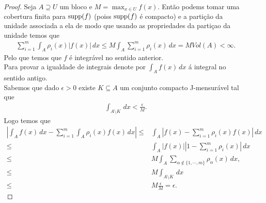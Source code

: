 \begin{proof} 
  Seja $A\supseteq U$ um bloco e $M=\max_{x\in U}f(x)$. Então podems tomar uma cobertura finita para $\operatorname{supp}(f)$ (poiss $\operatorname{supp}(f)$ é compacto) e a partição da unidade associada a ela de modo que usando as propriedades da partiçao da unidade temos que
  \begin{align*}
    \sum_{i=1}^{m}\int_{A}\rho_{i}(x)|f(x)|\,dx\leq M \int_{A}\sum_{i=1}^{m}\rho_i(x)\,dx=MVol(A)<\infty.
  \end{align*}
  Pelo que temos que $f$ é integrável no sentido anterior.\\
  Para provar a igualdade de integrais denote por $\int_{A}f(x)\,dx$ á integral no sentido antigo.\\
  Sabemos que dado $\epsilon>0$ existe $K\subseteq A$ um conjunto compacto J-mensurável tal que
  \begin{align*}
    \int_{A\setminus K}\,dx<\frac{\epsilon}{M}.
  \end{align*}
  Logo temos que
  \begin{align*}
    \left| \int_{A}f(x)\,dx-\sum_{i=1}^{m}\int_{A}\rho_{i}(x)f(x)\,dx \right|\leq& \int_{A}\left| f(x)-\sum_{i=1}^{m}\rho_{i}(x)f(x) \right|\,dx\\
    \leq& \int_{A}|f(x)|\left| 1-\sum_{i=1}^{m}\rho_i(x) \right|\,dx\\
    \leq& M \int_{A}\sum_{\alpha\notin\{1,\cdots,m\}}\rho_{\alpha}(x)\,dx,\\
    \leq& M \int_{A\setminus K}\,dx\\
    \leq& M\frac{\epsilon}{M}=\epsilon.
  \end{align*}
\end{proof}
